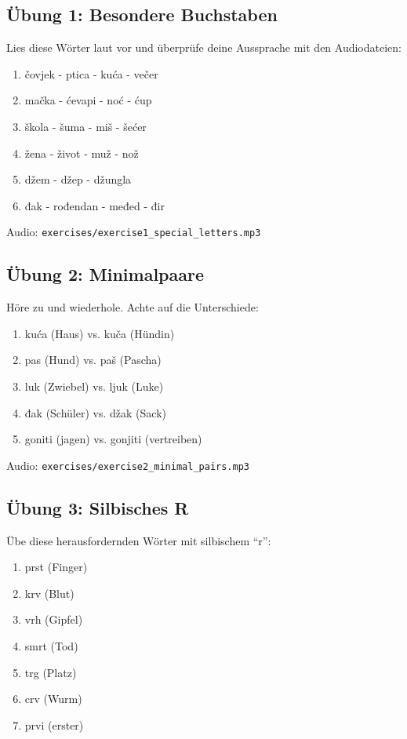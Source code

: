 \subsection{Übung 1: Besondere Buchstaben}

Lies diese Wörter laut vor und überprüfe deine Aussprache mit den Audiodateien:

\begin{enumerate}
    \item čovjek - ptica - kuća - večer
    \item mačka - ćevapi - noć - ćup
    \item škola - šuma - miš - šećer
    \item žena - život - muž - nož
    \item džem - džep - džungla
    \item đak - rođendan - međed - đir
\end{enumerate}

Audio: \texttt{exercises/exercise1\_special\_letters.mp3}

\subsection{Übung 2: Minimalpaare}

Höre zu und wiederhole. Achte auf die Unterschiede:

\begin{enumerate}
    \item kuća (Haus) vs. kuča (Hündin)
    \item pas (Hund) vs. paš (Pascha)
    \item luk (Zwiebel) vs. ljuk (Luke)
    \item đak (Schüler) vs. džak (Sack)
    \item goniti (jagen) vs. gonjiti (vertreiben)
\end{enumerate}

Audio: \texttt{exercises/exercise2\_minimal\_pairs.mp3}

\subsection{Übung 3: Silbisches R}

Übe diese herausfordernden Wörter mit silbischem ``r'':

\begin{enumerate}
    \item prst (Finger)
    \item krv (Blut)
    \item vrh (Gipfel)
    \item smrt (Tod)
    \item trg (Platz)
    \item crv (Wurm)
    \item prvi (erster)
\end{enumerate}

